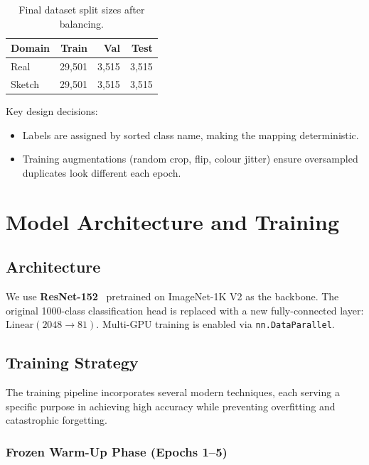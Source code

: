\documentclass[12pt, a4paper]{article}
\begin{document}
\begin{table}[H]
\centering
\caption{Final dataset split sizes after balancing.}
\label{tab:splits}
\begin{tabular}{lrrr}
\toprule
\textbf{Domain} & \textbf{Train} & \textbf{Val} & \textbf{Test} \\
\midrule
Real   & 29{,}501 & 3{,}515 & 3{,}515 \\
Sketch & 29{,}501 & 3{,}515 & 3{,}515 \\
\bottomrule
\end{tabular}
\end{table}

Key design decisions:
\begin{itemize}[leftmargin=*]
    
    \item Labels are assigned by sorted class name, making the mapping
          deterministic.
    \item Training augmentations (random crop, flip, colour jitter) ensure
          oversampled duplicates look different each epoch.
\end{itemize}


\section{Model Architecture and Training}
\label{sec:training}

\subsection{Architecture}

We use \textbf{ResNet-152}~\cite{he2016resnet} pretrained on ImageNet-1K V2 as
the backbone.  The original 1000-class classification head is replaced with a
new fully-connected layer: $\text{Linear}(2048 \to 81)$.  Multi-GPU training is
enabled via \texttt{nn.DataParallel}.

\subsection{Training Strategy}

The training pipeline incorporates several modern techniques, each serving a
specific purpose in achieving high accuracy while preventing overfitting and
catastrophic forgetting.

\subsubsection{Frozen Warm-Up Phase (Epochs 1--5)}
\end{document}
